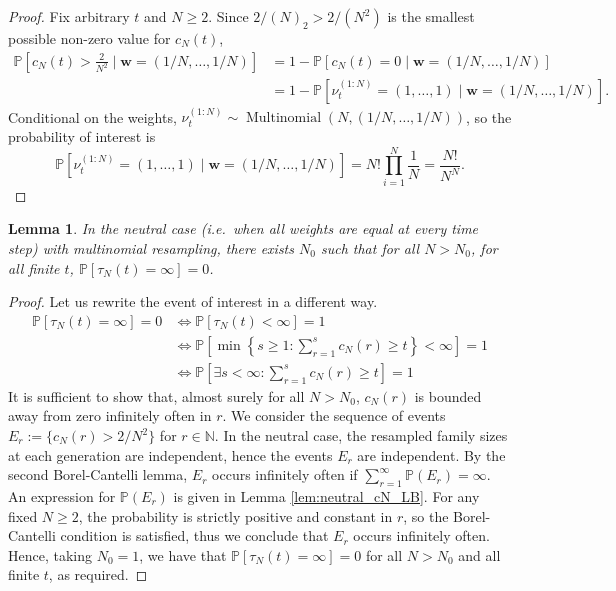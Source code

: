 \documentclass{article}
\newtheorem{lemma}{Lemma}
\newcommand{\PR}{\mathbb{P}}
\newcommand{\1}[1]{\mathbb{I}_{#1}}
\newcommand{\Mn}{\operatorname{Multinomial}}
\begin{document}
\begin{proof}
Fix arbitrary $t$ and $N\geq 2$. Since $2/(N)_2 > 2/(N^2)$ is the smallest possible non-zero value for $c_N(t)$,
\begin{align*}
\PR \left[c_N(t) > \frac{2}{N^2} \mid \mathbf{w}=(1/N, \dots, 1/N) \right]
&= 1- \PR[c_N(t) = 0  \mid \mathbf{w}=(1/N, \dots, 1/N)] \\
&= 1- \PR[\nu_t^{(1:N)} = (1,\dots, 1) \mid \mathbf{w}=(1/N, \dots, 1/N)].
\end{align*}
Conditional on the weights, $\nu_t^{(1:N)} \sim \Mn(N, (1/N, \dots, 1/N))$, so the probability of interest is
\begin{equation*}
\PR[\nu_t^{(1:N)} = (1,\dots, 1) \mid \mathbf{w}=(1/N, \dots, 1/N)] =
N! \prod_{i=1}^N \frac{1}{N}
= \frac{N!}{N^N}.
\end{equation*}
\end{proof}


\begin{lemma}\label{thm:nontrivial_mn_optimalw}
In the neutral case (i.e.\ when all weights are equal at every time step) with multinomial resampling, there exists $N_0$ such that for all $N>N_0$, for all finite $t$, $\PR[\tau_N(t) = \infty] =0$.
\end{lemma}

\begin{proof}
Let us rewrite the event of interest in a different way.
\begin{align*}
\PR[\tau_N(t) = \infty] =0 &\Leftrightarrow \PR[\tau_N(t) < \infty] =1 \\
&\Leftrightarrow \PR\left[ \min \left\{s \geq 1 : \sum_{r=1}^s c_N(r) \geq t \right\} < \infty \right] =1 \\
&\Leftrightarrow \PR\left[ \exists s<\infty : \sum_{r=1}^s c_N(r) \geq t \right] =1
\end{align*}
It is sufficient to show that, almost surely for all $N>N_0$, $c_N(r)$ is bounded away from zero infinitely often in $r$.
We consider the sequence of events 
$E_r := \{ c_N(r) > 2/N^2 \}$ for $r \in \mathbb{N}$.
In the neutral case, the resampled family sizes at each generation are independent, hence the events $E_r$ are independent. 
By the second Borel-Cantelli lemma, $E_r$ occurs infinitely often if $\sum_{r=1}^\infty \PR(E_r) = \infty$. 
An expression for $\PR(E_r)$ is given in Lemma \ref{lem:neutral_cN_LB}. 
For any fixed $N\geq 2$, the probability is strictly positive and constant in $r$, so the Borel-Cantelli condition is satisfied, thus we conclude that $E_r$ occurs infinitely often.
Hence, taking $N_0=1$, we have that $\PR[\tau_N(t) = \infty] =0$ for all $N>N_0$ and all finite $t$, as required.
\end{proof}
\end{document}
